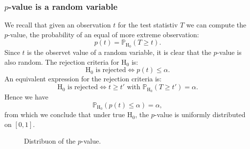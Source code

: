 \subsubsection{$p$-value is a random variable}

We recall that given an observation $t$ for the test statistiv $T$ we can compute the $p$-value, the probability of an equal of more extreme observation:
$$
    p(t) = \mathbb{P}_{\mathrm{H}_0} (T \geq t).
$$
Since $t$ is the observet value of a random variable, it is clear that the $p$-value is also random. The rejection criteria for $\mathrm{H}_0$ is: 
$$
    \mathrm{H}_0 \textrm{ is rejected} \Leftrightarrow p(t) \leq \alpha.
$$
An equivalent expression for the rejection criteria is:
$$
\mathrm{H}_0 \textrm{ is rejected} \Leftrightarrow t \geq t' \textrm{ with } \mathbb{P}_{\mathrm{H}_0} (T \geq t') = \alpha.    
$$
Hence we have
$$
    \mathbb{P}_{\mathrm{H}_0} (p(t) \leq \alpha) = \alpha,
$$
from which we conclude that under true $\mathrm{H}_0$, the $p$-value is uniformly distributed on $[0,1]$.

\begin{figure}[H]\centering
    \caption{Distribuon of the $p$-value.}
\end{figure}

